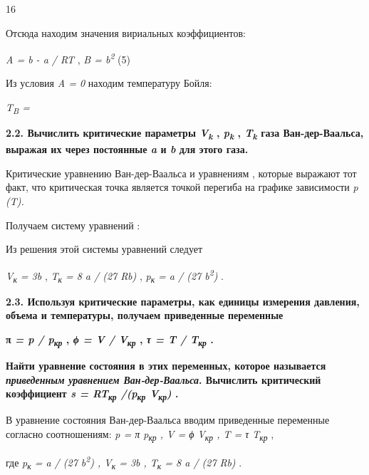 16

Отсюда находим значения вириальных коэффициентов:

\emph{A = b - a / RT} , \emph{B = b\textsuperscript{2}} (5)

Из условия \emph{A = 0} находим температуру Бойля:

\emph{T\textsubscript{B} =} %

\textbf{2.2. Вычислить критические параметры \emph{V\textsubscript{k}} ,
\emph{p\textsubscript{k}} , \emph{T\textsubscript{k}} газа
Ван-дер-Ваальса, выражая их через постоянные \emph{a} и \emph{b} для
этого газа.}

\solving{}

Критические%
уравнению Ван-дер-Ваальса и уравнениям
, которые выражают тот факт, что критическая точка является точкой
перегиба на графике зависимости \emph{p (T).}

Получаем систему уравнений :


Из решения этой системы уравнений следует

\emph{V\textsubscript{к} = 3b} , \emph{T\textsubscript{к} = 8 a / (27
Rb)} , \emph{p\textsubscript{к} = a / (27 b\textsuperscript{2})}
.%

\textbf{2.3. Используя критические параметры, как единицы измерения
давления, объема и температуры, получаем приведенные переменные}

\textbf{π \emph{= p / p\textsubscript{кр}} , \emph{ϕ = V /
V\textsubscript{кр}} , \emph{τ = T / T\textsubscript{кр}} .}

\textbf{Найти уравнение состояния в этих переменных, которое называется
\emph{приведенным уравнением Ван-дер-Ваальса}. Вычислить критический
коэффициент \emph{s = RT\textsubscript{кр} /(p\textsubscript{кр}
V\textsubscript{кр})} .}

\solving{}

В уравнение состояния Ван-дер-Ваальса вводим приведенные переменные
согласно соотношениям: \emph{p = π p\textsubscript{кр} , V = ϕ
V\textsubscript{кр} , T = τ T\textsubscript{кр}} ,

где \emph{p\textsubscript{к} = a / (27 b\textsuperscript{2}) ,
V\textsubscript{к} = 3b , T\textsubscript{к} = 8 a / (27 Rb)} .

